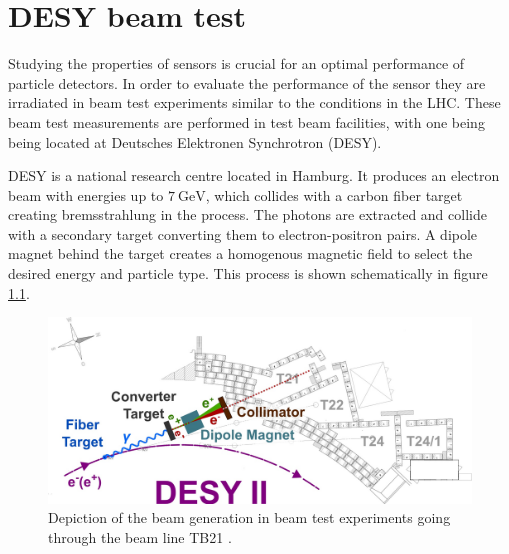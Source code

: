 \chapter{DESY beam test}
Studying the properties of sensors is crucial for an optimal performance of particle detectors.
In order to evaluate the performance of the sensor they are irradiated in beam test experiments similar to the conditions in the LHC.
These beam test measurements are performed in test beam facilities, with one being being located at Deutsches Elektronen Synchrotron (DESY).

DESY is a national research centre located in Hamburg.
It produces an electron beam with energies up to
$\SI{7}{\GeV}$, which collides with a carbon fiber target creating bremsstrahlung in the process. The photons are extracted and collide with a secondary target
converting them to electron-positron pairs. A dipole magnet behind the target creates a homogenous magnetic field to select the desired energy and particle type. This process
is shown schematically in figure \ref{fig:testbeam}.

\begin{figure}
  \centering
  \includegraphics[height=0.4\textwidth]{images/desy_modified.jpg}
  \caption{Depiction of the beam generation in beam test experiments going through the beam line TB21 \cite{testbeam}.}
  \label{fig:testbeam}
\end{figure}

